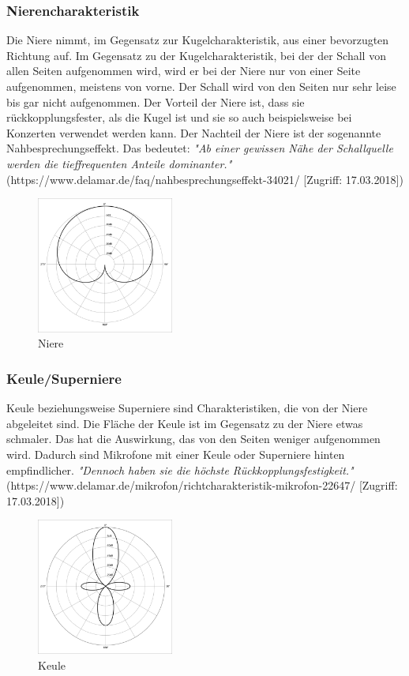 \subsubsection{Nierencharakteristik}
Die Niere nimmt, im Gegensatz zur Kugelcharakteristik, aus einer bevorzugten Richtung auf. Im Gegensatz zu der Kugelcharakteristik, bei der der Schall von allen Seiten aufgenommen wird, wird er bei der Niere nur von einer Seite aufgenommen, meistens von vorne. Der Schall wird von den Seiten nur sehr leise bis gar nicht aufgenommen. Der Vorteil der Niere ist, dass sie rückkopplungsfester, als die Kugel ist und sie so auch beispielsweise bei Konzerten verwendet werden kann. Der Nachteil der Niere ist der sogenannte Nahbesprechungseffekt.\citep{naheffekt}\citep{kugel} Das bedeutet: \textit{"Ab einer gewissen Nähe der Schallquelle werden die tieffrequenten Anteile dominanter."}(https://www.delamar.de/faq/nahbesprechungseffekt-34021/ [Zugriff: 17.03.2018])
\begin{figure}[H]
	\centering
	\includegraphics[width=0.4\textwidth]{abb5} 
	\caption[Niere]{Niere\footnotemark}
\end{figure}
\subsubsection{Keule/Superniere}
Keule beziehungsweise Superniere sind Charakteristiken, die von der Niere abgeleitet sind. Die Fläche der Keule ist im Gegensatz zu der Niere etwas schmaler. Das hat die Auswirkung, das von den Seiten weniger aufgenommen wird. Dadurch sind Mikrofone mit einer Keule oder Superniere hinten empfindlicher.\citep{kugel} \textit{"Dennoch haben sie die höchste Rückkopplungsfestigkeit."}(https://www.delamar.de/mikrofon/richtcharakteristik-mikrofon-22647/ [Zugriff: 17.03.2018])
\begin{figure}[H]
	\centering
	\includegraphics[width=0.4\textwidth]{abb6} 
	\caption[Keule]{Keule\footnotemark}
\end{figure}
